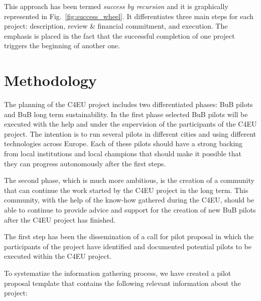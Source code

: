 \documentclass[conference]{IEEEtran}
\begin{document}
This approach has been termed \emph{success by recursion} and it is graphically represented in Fig.~\ref{fig:success_wheel}.
It differentiates three main steps for each project: description, review \& financial commitment, and execution.
The emphasis is placed in the fact that the successful completion of one project triggers the beginning of another one.

\section{Methodology}

The planning of the C4EU project includes two differentiated phases: BuB pilots and BuB long term sustainability.
In the first phase selected BuB pilots will be executed with the help and under the supervision of the participants of the C4EU project.
The intention is to run several pilots in different cities and using different technologies across Europe.
Each of these pilots should have a strong backing from local institutions and local champions that should make it possible that they can progress autonomously after the first steps.

The second phase, which is much more ambitious, is the creation of a community that can continue the work started by the C4EU project in the long term.
This community, with the help of the know-how gathered during the C4EU, should be able to continue to provide advice and support for the creation of new BuB pilots after the C4EU project has finished.

The first step has been the dissemination of a call for pilot proposal in which the participants of the project have identified and documented potential pilots to be executed within the C4EU project.

To systematize the information gathering process, we have created a pilot proposal template that contains the following relevant information about the project:
\end{document}
